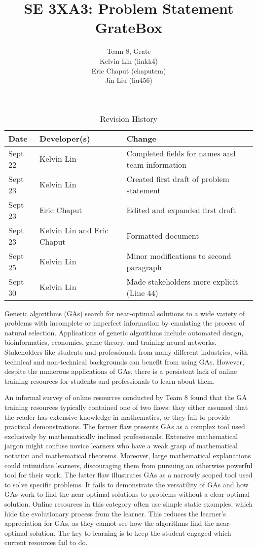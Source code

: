 \documentclass{article}
\title{SE 3XA3: Problem Statement\\GrateBox}
\author{Team 8, Grate
		\\ Kelvin Lin (linkk4)
		\\ Eric Chaput (chaputem)
		\\ Jin Liu (liu456)
}
\date{}
\begin{document}
\begin{table}[hp]
\color{blue}
\caption{Revision History} \label{TblRevisionHistory}
\begin{tabularx}{\textwidth}{llX}
\toprule
\textbf{Date} & \textbf{Developer(s)} & \textbf{Change}\\
\midrule
Sept 22 & Kelvin Lin & Completed fields for names and team information\\
Sept 23 & Kelvin Lin & Created first draft of problem statement\\
Sept 23 & Eric Chaput & Edited and expanded first draft\\
Sept 23 & Kelvin Lin and Eric Chaput& Formatted document\\
Sept 25 & Kelvin Lin & Minor modifications to second paragraph\\
Sept 30 & Kelvin Lin & Made stakeholders more explicit (Line 44)\\
\bottomrule
\end{tabularx}
\end{table}

\newpage
\color{black}
\maketitle

Genetic algorithms (GAs) search for near-optimal solutions to a wide variety of 
problems with incomplete or imperfect information by emulating the process of 
natural selection. Applications of genetic algorithms include automated design, 
bioinformatics, economics, game theory, and training neural networks. 
Stakeholders like students 
and professionals from many different industries, with technical and 
non-technical backgrounds can benefit from using GAs. However, despite the 
numerous applications of GAs, there is a persistent lack of online training 
resources for students and professionals to learn about them. 

An informal survey of online resources conducted by Team 8 found that the GA 
training resources typically contained one of two flaws: they either assumed 
that the reader has extensive knowledge in mathematics, or they fail to provide 
practical demonstrations. The former flaw presents GAs as a complex tool used 
exclusively by mathematically inclined professionals. Extensive mathematical 
jargon might confuse novice learners who have a weak grasp of mathematical 
notation and mathematical theorems. Moreover, large mathematical explanations 
could intimidate learners, discouraging them from pursuing an otherwise powerful 
tool for their work. The latter flaw illustrates GAs as a narrowly scoped tool 
used to solve specific problems. It fails to demonstrate the versatility of GAs 
and how GAs work to find the near-optimal solutions to problems without a clear 
optimal solution. Online resources in this category often use simple static 
examples, which hide the evolutionary process from the learner. This reduces the 
learner's appreciation for GAs, as they cannot see how the algorithms find the 
near-optimal solution. The key to learning is to keep the student engaged which 
current resources fail to do.
\end{document}
